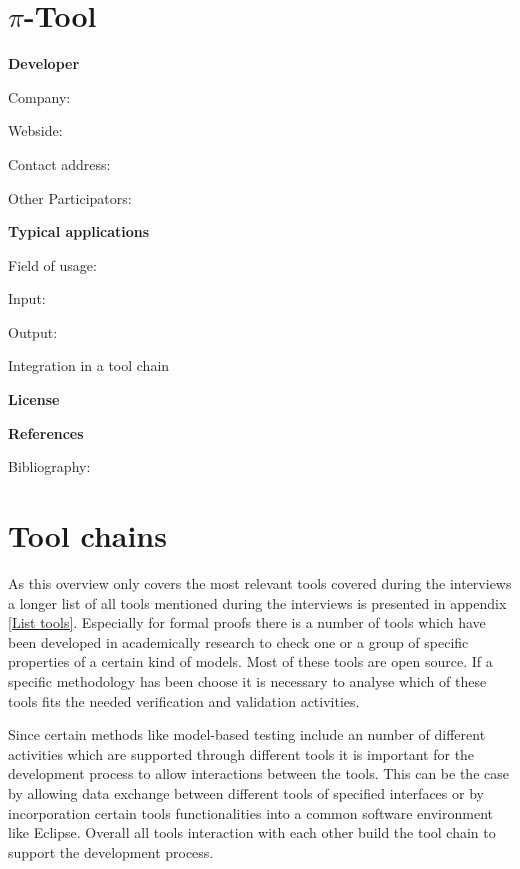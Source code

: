 \documentclass{./template/openetcs2}
\begin{document}
\section{$\pi$-Tool}

	\textbf{Developer}

	Company: 

	Webside:

	Contact address:

	Other  Participators:



	\textbf{Typical applications}

	Field of usage:


	Input:

	Output:





	Integration in a tool chain



	\textbf{License}


	\textbf{References}

	Bibliography:


\section{Tool chains}
As this overview only covers the most relevant tools covered during the interviews a longer list of all tools mentioned during the interviews is presented in appendix \ref{List tools}. Especially for formal proofs there is a number of tools which have been developed in academically research to check one or a group of specific properties of a certain kind of models. Most of these tools are open source. If a specific methodology has been choose it is necessary to analyse which of these tools fits the needed verification and validation activities.

Since certain methods like model-based testing include an number of different activities which are supported through different tools it is important for the development process to allow interactions between the tools. This can be the case by allowing data exchange between different tools of specified interfaces or by incorporation certain tools functionalities into a common software  environment like Eclipse. Overall all tools interaction with each other build the tool chain to support the development process. 
\end{document}
